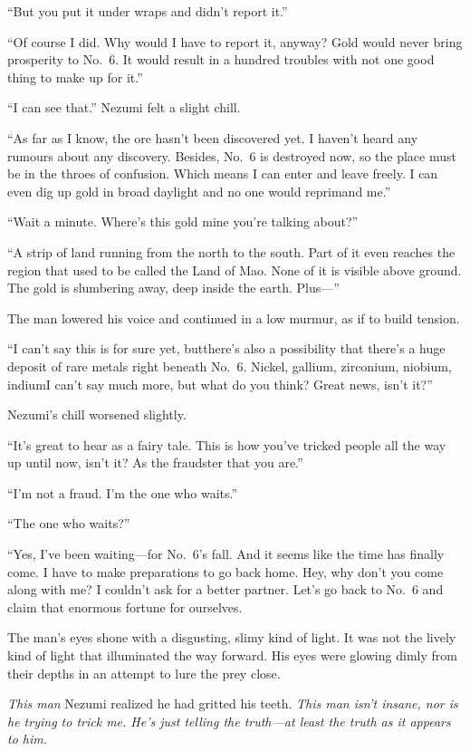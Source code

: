 ``But you put it under wraps and didn't report it.''

``Of course I did. Why would I have to report it, anyway? Gold would
never bring prosperity to No.~6. It would result in a hundred troubles
with not one good thing to make up for it.''

``I can see that.'' Nezumi felt a slight chill.

``As far as I know, the ore hasn't been discovered yet. I haven't heard
any rumours about any discovery. Besides, No.~6 is destroyed now, so the
place must be in the throes of confusion. Which means I can enter and
leave freely. I can even dig up gold in broad daylight and no one would
reprimand me.''

``Wait a minute. Where's this gold mine you're talking about?''

``A strip of land running from the north to the south. Part of it even
reaches the region that used to be called the Land of Mao. None of it is
visible above ground. The gold is slumbering away, deep inside the
earth. Plus---''

The man lowered his voice and continued in a low murmur, as if to build
tension.

``I can't say this is for sure yet, but\el there's also a possibility
that there's a huge deposit of rare metals right beneath No.~6. Nickel,
gallium, zirconium, niobium, indium\el I can't say much more, but what
do you think? Great news, isn't it?''

Nezumi's chill worsened slightly.

``\el It's great to hear as a fairy tale. This is how you've tricked
people all the way up until now, isn't it? As the fraudster that you
are.''

``I'm not a fraud. I'm the one who waits.''

``The one who waits?''

``Yes, I've been waiting---for No.~6's fall. And it seems like the time
has finally come. I have to make preparations to go back home. Hey, why
don't you come along with me? I couldn't ask for a better partner. Let's
go back to No.~6 and claim that enormous fortune for ourselves.

The man's eyes shone with a disgusting, slimy kind of light. It was not
the lively kind of light that illuminated the way forward. His eyes were
glowing dimly from their depths in an attempt to lure the prey close.

\emph{This man\el } Nezumi realized he had gritted his teeth. \emph{This man isn't
insane, nor is he trying to trick me. He's just telling the truth---at
least the truth as it appears to him.}

